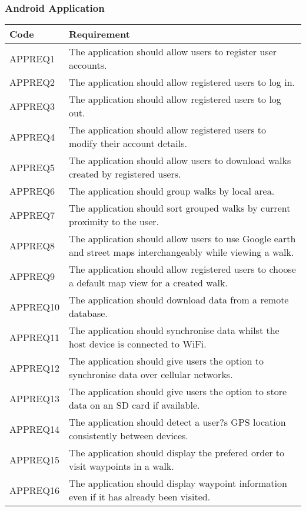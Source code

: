 \documentclass[11pt,a4paper]{article}
\begin{document}
\subsubsection{Android Application}

\begin{longtable}{|p{2.5cm}p{13cm}|}
\hline
\textbf{Code} & \textbf{Requirement} \\
\hline
APPREQ1 & The application should allow users to register user accounts. \\ \hline
APPREQ2 & The application should allow registered users to log in. \\ \hline
APPREQ3 & The application should allow registered users to log out. \\ \hline
APPREQ4 & The application should allow registered users to modify their account details. \\ \hline
APPREQ5 & The application should allow users to download walks created by registered users. \\ \hline
APPREQ6 & The application should group walks by local area. \\ \hline
APPREQ7 & The application should sort grouped walks by current proximity to the user. \\ \hline
APPREQ8 & The application should allow users to use Google earth and street maps interchangeably while viewing a walk. \\ \hline
APPREQ9 & The application should allow registered users to choose a default map view for a created walk. \\ \hline
APPREQ10 & The application should download data from a remote database. \\ \hline
APPREQ11 & The application should synchronise data whilst the host device is connected to WiFi. \\ \hline
APPREQ12 & The application should give users the option to synchronise data over cellular networks. \\ \hline
APPREQ13 & The application should give users the option to store data on an SD card if available. \\ \hline
APPREQ14 & The application should detect a user?s GPS location consistently between devices. \\ \hline
APPREQ15 & The application should display the prefered order to visit waypoints in a walk. \\ \hline
APPREQ16 & The application should display waypoint information even if it has already been visited. \\ \hline

\end{longtable}
\end{document}
